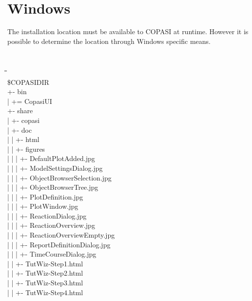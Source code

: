 \documentclass[12pt]{book}
\begin{document}
\section{Windows}
The installation location must be available to COPASI at
runtime. However it is possible to determine the location through
Windows specific means.
{\tt \scriptsize
\begin{tabbing}
 \hspace{4 pt}\=\hspace{17 pt}\=\hspace{17 pt}\=\hspace{17
 pt}\=\hspace{17 pt}\=\hspace{17 pt}\= \\ [-12 pt]
 \$COPASIDIR \\
 \> +- bin \\
 \> | \> += CopasiUI \\
 \> +- share \\
 \> | \> +- copasi \\
 \> | \> \> +- doc \\
 \> | \> \> | \> +- html \\
 \> | \> \> | \> \> +- figures \\
 \> | \> \> | \> \> | \> +- DefaultPlotAdded.jpg \\
 \> | \> \> | \> \> | \> +- ModelSettingsDialog.jpg \\
 \> | \> \> | \> \> | \> +- ObjectBrowserSelection.jpg \\
 \> | \> \> | \> \> | \> +- ObjectBrowserTree.jpg \\
 \> | \> \> | \> \> | \> +- PlotDefinition.jpg \\
 \> | \> \> | \> \> | \> +- PlotWindow.jpg \\
 \> | \> \> | \> \> | \> +- ReactionDialog.jpg \\
 \> | \> \> | \> \> | \> +- ReactionOverview.jpg \\
 \> | \> \> | \> \> | \> +- ReactionOverviewEmpty.jpg \\
 \> | \> \> | \> \> | \> +- ReportDefinitionDialog.jpg \\
 \> | \> \> | \> \> | \> +- TimeCourseDialog.jpg \\
 \> | \> \> | \> \> +- TutWiz-Step1.html \\
 \> | \> \> | \> \> +- TutWiz-Step2.html \\
 \> | \> \> | \> \> +- TutWiz-Step3.html \\
 \> | \> \> | \> \> +- TutWiz-Step4.html \\

\end{tabbing}}
\end{document}
